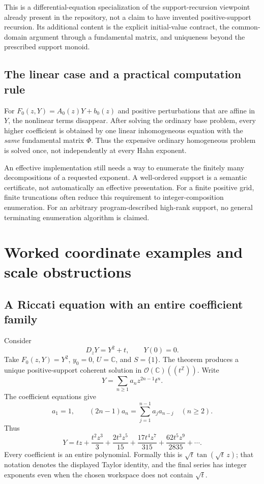 \documentclass[11pt,letterpaper]{article}
\numberwithin{equation}{section}
\theoremstyle{definition}
\theoremstyle{remark}
\newcommand{\C}{\mathbb C}
\newcommand{\Z}{\mathbb Z}
\newcommand{\OO}{\mathcal O}
\begin{document}
This is a differential-equation specialization of the support-recursion viewpoint already present in the repository, not a claim to have invented positive-support recursion. Its additional content is the explicit initial-value contract, the common-domain argument through a fundamental matrix, and uniqueness beyond the prescribed support monoid.

\subsection{The linear case and a practical computation rule}
For $F_0(z,Y)=A_0(z)Y+b_0(z)$ and positive perturbations that are affine in $Y$, the nonlinear terms disappear. After solving the ordinary base problem, every higher coefficient is obtained by one linear inhomogeneous equation with the \emph{same} fundamental matrix $\Phi$. Thus the expensive ordinary homogeneous problem is solved once, not independently at every Hahn exponent.

An effective implementation still needs a way to enumerate the finitely many decompositions of a requested exponent. A well-ordered support is a semantic certificate, not automatically an effective presentation. For a finite positive grid, finite truncations often reduce this requirement to integer-composition enumeration. For an arbitrary program-described high-rank support, no general terminating enumeration algorithm is claimed.

\section{Worked coordinate examples and scale obstructions}\label{sec:examples}

\subsection{A Riccati equation with an entire coefficient family}
Consider
\begin{equation}\label{eq:riccati}
 D_zY=Y^2+t,\qquad Y(0)=0.
\end{equation}
Take $F_0(z,Y)=Y^2$, $y_0=0$, $U=\C$, and $S=\{1\}$. The theorem produces a unique positive-support coherent solution in $\OO(\C)((t^\Z))$. Write
\[
 Y=\sum_{n\ge1}a_n z^{2n-1}t^n.
\]
The coefficient equations give
\begin{equation}\label{eq:riccatirecur}
 a_1=1,\qquad
 (2n-1)a_n=\sum_{j=1}^{n-1}a_j a_{n-j}\quad(n\ge2).
\end{equation}
Thus
\begin{equation}\label{eq:riccatiexpand}
 Y=tz+\frac{t^2z^3}{3}+\frac{2t^3z^5}{15}
   +\frac{17t^4z^7}{315}
   +\frac{62t^5z^9}{2835}+\cdots.
\end{equation}
Every coefficient is an entire polynomial. Formally this is $\sqrt t\tan(\sqrt t\,z)$; that notation denotes the displayed Taylor identity, and the final series has integer exponents even when the chosen workspace does not contain $\sqrt t$.
\end{document}
